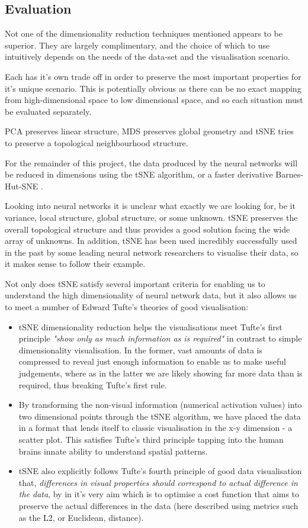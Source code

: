 \documentclass[a4paper,11pt,titlepage]{article}
\begin{document}
	\subsection{Evaluation}
	Not one of the dimensionality reduction techniques mentioned appears to be superior. They are largely complimentary, and the choice of which to use intuitively depends on the needs of the data-set and the visualisation scenario. 
	\par 
	Each has it's own trade off in order to preserve the most important properties for it's unique scenario. This is potentially obvious as there can be no exact mapping from high-dimensional space to low dimensional space, and so each situation must be evaluated separately. 
		\par 
		PCA preserves linear structure, MDS preserves global geometry and tSNE tries to preserve a topological neighbourhood structure.
		\par 
		For the remainder of this project, the data produced by the neural networks will be reduced in dimensions using the tSNE algorithm, or a faster derivative Barnes-Hut-SNE \cite{VanderMaaten2013}.
		\par 
		Looking into neural networks it is unclear what exactly we are looking for, be it variance, local structure, global structure, or some unknown. tSNE preserves the overall topological structure and thus provides a good solution facing the wide array of unknowns. In addition, tSNE has been used incredibly successfully used in the past by some leading neural network researchers to visualise their data\cite{Maaten2008}, so it makes sense to follow their example.
		\par 
		Not only does tSNE satisfy several important criteria for enabling us to understand the high dimensionality of neural network data, but it also allows us to meet a number of Edward Tufte's theories of good visualisation:
		\begin{itemize}
			\item tSNE dimensionality reduction helps the visualisations meet Tufte's first principle \textit{"show only as much information as is required"} in contrast to simple dimensionality visualisation. In the former, vast amounts of data is compressed to reveal just enough information to enable us to make useful judgements, where as in the latter we are likely showing far more data than is required, thus breaking Tufte's first rule.
			\item By transforming the non-visual information (numerical activation values) into two dimensional points through the tSNE algorithm, we have placed the data in a format that lends itself to classic visualisation in the x-y dimension - a scatter plot. This satisfies Tufte's third principle tapping into the human brains innate ability to understand spatial patterns.
			\item tSNE also explicitly follows Tufte's fourth principle of good data visualisation that, \textit{differences in visual properties should correspond to actual difference in the data}, by in it's very aim which is to optimise a cost function that aims to preserve the actual differences in the data (here described using metrics such as the L2, or Euclidean, distance).
		\end{itemize}
\end{document}
